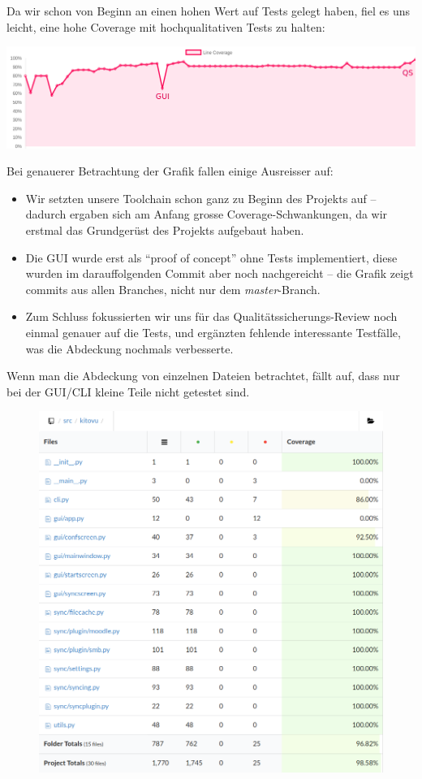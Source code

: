 \documentclass[a4paper]{article}
\begin{document}
Da wir schon von Beginn an einen hohen Wert auf Tests gelegt haben, fiel es uns
leicht, eine hohe Coverage mit hochqualitativen Tests zu halten:

\includegraphics[width=\linewidth]{img/coverage.png}

Bei genauerer Betrachtung der Grafik fallen einige Ausreisser auf:

\begin{itemize}
  \item Wir setzten unsere Toolchain schon ganz zu Beginn des Projekts auf --
    dadurch ergaben sich am Anfang grosse Coverage-Schwankungen, da wir erstmal
    das Grundgerüst des Projekts aufgebaut haben.
  \item Die GUI wurde erst als ``proof of concept'' ohne Tests implementiert,
    diese wurden im darauffolgenden Commit aber noch nachgereicht -- die Grafik
    zeigt commits aus allen Branches, nicht nur dem \emph{master}-Branch.
  \item Zum Schluss fokussierten wir uns für das Qualitätssicherungs-Review noch
    einmal genauer auf die Tests, und ergänzten fehlende interessante Testfälle,
    was die Abdeckung nochmals verbesserte.
\end{itemize}

Wenn man die Abdeckung von einzelnen Dateien betrachtet, fällt auf, dass nur bei
der GUI/CLI kleine Teile nicht getestet sind.

\begin{figure}
\includegraphics[width=0.97\linewidth]{img/coverage_files.png}
\end{figure}
\end{document}
